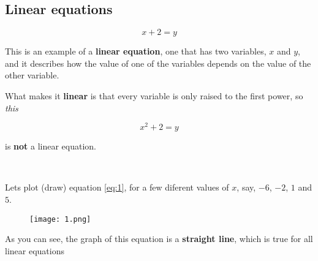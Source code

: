 \documentclass{article}
\begin{document}
\subsection{Linear equations}

\begin{equation} \label{eq:1}
x + 2 = y 
\end{equation}

This is an example of a \textbf{linear equation}, one that has two variables, $x$ and $y$, and it describes how the value of one of the variables depends on the value of the other variable. 

What makes it \textbf{linear} is that every variable is only raised to the first power, so \textit{this}

\[
x^2 + 2 = y
\]

is \textbf{not} a linear equation.

\


Lets plot (draw) equation \eqref{eq:1},  for a few diferent values of $x$, say, $-6$, $-2$, $1$ and $5$.



\begin{figure}[h]
\centering
\texttt{[image: 1.png]}
\end{figure}

As you can see, the graph of this equation is a \textbf{straight line}, which is true for all linear equations
\end{document}
